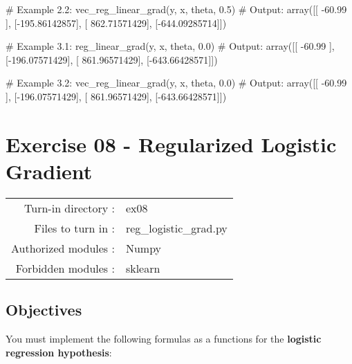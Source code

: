 \documentclass[]{article}
\newenvironment{Shaded}{\begin{snugshade}}{\end{snugshade}}
\newcommand{\CommentTok}[1]{\textcolor[rgb]{0.48,0.49,0.49}{#1}}
\newcommand{\FloatTok}[1]{\textcolor[rgb]{0.96,0.45,0.00}{#1}}
\newcommand{\NormalTok}[1]{\textcolor[rgb]{0.81,0.81,0.76}{#1}}
\newcommand{\OperatorTok}[1]{\textcolor[rgb]{0.81,0.81,0.76}{#1}}
\begin{document}
\begin{Shaded}
\begin{Highlighting}[]
\CommentTok{# Example 2.2:}
\NormalTok{vec_reg_linear_grad(y, x, theta, }\FloatTok{0.5}\NormalTok{)}
\CommentTok{# Output:}
\NormalTok{array([[ }\FloatTok{-60.99}\NormalTok{      ],}
\NormalTok{       [}\OperatorTok{-}\FloatTok{195.86142857}\NormalTok{],}
\NormalTok{       [ }\FloatTok{862.71571429}\NormalTok{],}
\NormalTok{       [}\OperatorTok{-}\FloatTok{644.09285714}\NormalTok{]])}

\CommentTok{# Example 3.1:}
\NormalTok{reg_linear_grad(y, x, theta, }\FloatTok{0.0}\NormalTok{)}
\CommentTok{# Output:}
\NormalTok{array([[ }\FloatTok{-60.99}\NormalTok{      ],}
\NormalTok{       [}\OperatorTok{-}\FloatTok{196.07571429}\NormalTok{],}
\NormalTok{       [ }\FloatTok{861.96571429}\NormalTok{],}
\NormalTok{       [}\OperatorTok{-}\FloatTok{643.66428571}\NormalTok{]])}

\CommentTok{# Example 3.2:}
\NormalTok{vec_reg_linear_grad(y, x, theta, }\FloatTok{0.0}\NormalTok{)}
\CommentTok{# Output:}
\NormalTok{array([[ }\FloatTok{-60.99}\NormalTok{      ],}
\NormalTok{       [}\OperatorTok{-}\FloatTok{196.07571429}\NormalTok{],}
\NormalTok{       [ }\FloatTok{861.96571429}\NormalTok{],}
\NormalTok{       [}\OperatorTok{-}\FloatTok{643.66428571}\NormalTok{]])}
\end{Highlighting}
\end{Shaded}

\clearpage

\hypertarget{exercise-08---regularized-logistic-gradient-1}{%
\section{Exercise 08 - Regularized Logistic
Gradient}\label{exercise-08---regularized-logistic-gradient-1}}

\begin{longtable}[]{@{}rl@{}}
\toprule
\endhead
Turn-in directory : & ex08\tabularnewline
Files to turn in : & reg\_logistic\_grad.py\tabularnewline
Authorized modules : & Numpy\tabularnewline
Forbidden modules : & sklearn\tabularnewline
\bottomrule
\end{longtable}

\hypertarget{objectives-7}{%
\subsection{Objectives}\label{objectives-7}}

You must implement the following formulas as a functions for the
\textbf{logistic regression hypothesis}:
\end{document}
